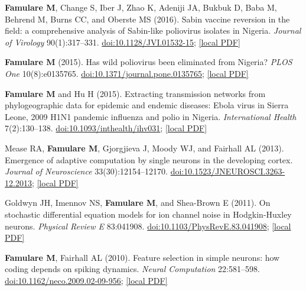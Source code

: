 \documentclass{article}
\begin{document}
\begin{llist}
\begin{items}
\item[{[7]}] \textbf{Famulare M}, Change S, Iber J, Zhao K, Adeniji JA, Bukbuk D, Baba M, Behrend M, Burns CC, and Oberste MS (2016). Sabin vaccine reversion in the field: a comprehensive analysis of Sabin-like poliovirus isolates in Nigeria. \emph{Journal of Virology} 90(1):317--331. \href{https://doi.org/10.1128/JVI.01532-15}{doi:10.1128/JVI.01532-15}; \href{https://famulare.github.io/assets/publication-mirror/Famulare_et_al_2016_Sabin_vaccine_reversion_in_the_field.pdf}{[local PDF]}
	
\item[{[6]}] \textbf{Famulare M} (2015). Has wild poliovirus been eliminated from Nigeria? \emph{PLOS One} 10(8):e0135765. \href{https://doi.org/10.1371/journal.pone.0135765}{doi:10.1371/journal.pone.0135765}; \href{https://famulare.github.io/assets/publication-mirror/journal-06.pdf}{[local PDF]}
	
\item[{[5]}] \textbf{Famulare M} and Hu H (2015). Extracting transmission networks from phylogeographic data for epidemic and endemic diseases: Ebola virus in Sierra Leone, 2009 H1N1 pandemic influenza and polio in Nigeria. \emph{International Health} 7(2):130--138. \href{https://doi.org/10.1093/inthealth/ihv031}{doi:10.1093/inthealth/ihv031}; \href{https://famulare.github.io/assets/publication-mirror/journal-05.pdf}{[local PDF]}

\item[{[4]}] Mease RA, \textbf{Famulare M}, Gjorgjieva J, Moody WJ, and Fairhall AL (2013). Emergence of adaptive computation by single neurons in the developing cortex. \emph{Journal of Neuroscience} 33(30):12154--12170. \href{https://doi.org/10.1523/JNEUROSCI.3263-12.2013}{doi:10.1523/JNEUROSCI.3263-12.2013}; \href{https://famulare.github.io/assets/publication-mirror/journal-04.pdf}{[local PDF]}
	
\item[{[3]}] Goldwyn JH, Imennov NS, \textbf{Famulare M}, and Shea-Brown E (2011).  On stochastic differential equation models for ion channel noise in Hodgkin-Huxley neurons. \emph{Physical Review E} 83:041908. \href{https://doi.org/10.1103/PhysRevE.83.041908}{doi:10.1103/PhysRevE.83.041908}; \href{https://famulare.github.io/assets/publication-mirror/journal-03.pdf}{[local PDF]}

\item[{[2]}] \textbf{Famulare M}, Fairhall AL (2010). Feature selection in simple neurons: how coding depends on spiking dynamics. \emph{Neural Computation} 22:581--598. \href{https://doi.org/10.1162/neco.2009.02-09-956}{doi:10.1162/neco.2009.02-09-956}; \href{https://famulare.github.io/assets/publication-mirror/journal-02.pdf}{[local PDF]}


\end{items}
\end{llist}
\end{document}
